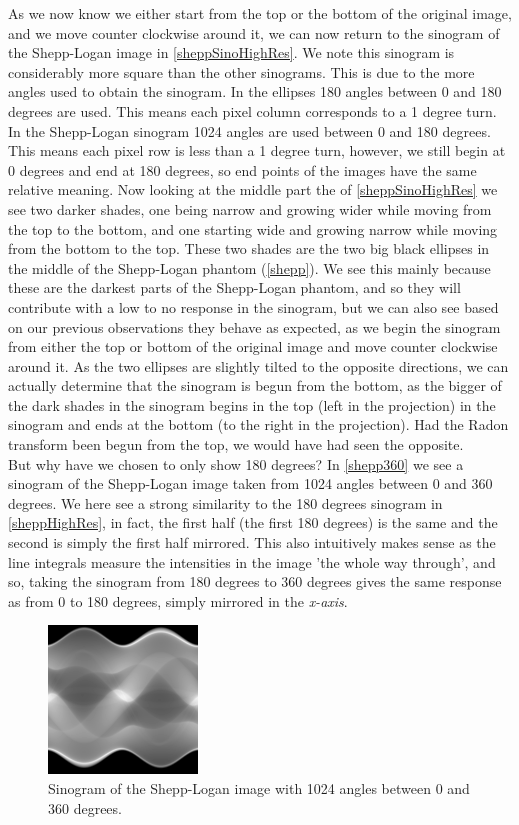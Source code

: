 As we now know we either start from the top or the bottom of the original image, and we move counter clockwise around it, we can now return to the sinogram of the Shepp-Logan image in \autoref{sheppSinoHighRes}. We note this sinogram is considerably more square than the other sinograms. This is due to the more angles used to obtain the sinogram. In the ellipses 180 angles between 0 and 180 degrees are used. This means each pixel column corresponds to a 1 degree turn. In the Shepp-Logan sinogram 1024 angles are used between 0 and 180 degrees. This means each pixel row is less than a 1 degree turn, however, we still begin at 0 degrees and end at 180 degrees, so end points of the images have the same relative meaning. Now looking at the middle part the of \autoref{sheppSinoHighRes} we see two darker shades, one being narrow and growing wider while moving from the top to the bottom, and one starting wide and growing narrow while moving from the bottom to the top. These two shades are the two big black ellipses in the middle of the Shepp-Logan phantom (\autoref{shepp}). We see this mainly because these are the darkest parts of the Shepp-Logan phantom, and so they will contribute with a low to no response in the sinogram, but we can also see based on our previous observations they behave as expected, as we begin the sinogram from either the top or bottom of the original image and move counter clockwise around it. As the two ellipses are slightly tilted to the opposite directions, we can actually determine that the sinogram is begun from the bottom, as the bigger of the dark shades in the sinogram begins in the top (left in the projection) in the sinogram and ends at the bottom (to the right in the projection). Had the Radon transform been begun from the top, we would have had seen the opposite.\\
But why have we chosen to only show 180 degrees? In \autoref{shepp360} we see a sinogram of the Shepp-Logan image taken from 1024 angles between 0 and 360 degrees. We here see a strong similarity to the 180 degrees sinogram in \autoref{sheppHighRes}, in fact, the first half (the first 180 degrees) is the same and the second is simply the first half mirrored. This also intuitively makes sense as the line integrals measure the intensities in the image 'the whole way through', and so, taking the sinogram from 180 degrees to 360 degrees gives the same response as from 0 to 180 degrees, simply mirrored in the \textit{x-axis}.
\begin{figure}
	\centering
	\includegraphics[width=0.5\linewidth]{Materials/shepp360}
	\caption{Sinogram of the Shepp-Logan image with 1024 angles between 0 and 360 degrees.}
	\label{shepp360}
\end{figure}